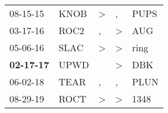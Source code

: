 \begin{supertabular}{p{0.07\textwidth}p{0.06\textwidth}p{0.02\textwidth}p{0.02\textwidth}p{0.06\textwidth}}
          08-15-15\textsuperscript{} &           KNOB\textsuperscript{} &     \textgreater &                , &           PUPS\textsuperscript{} \\
          03-17-16\textsuperscript{} &           ROC2\textsuperscript{} &                , &     \textgreater &            AUG\textsuperscript{} \\
          05-06-16\textsuperscript{} &           SLAC\textsuperscript{} &     \textgreater &     \textgreater &           ring\textsuperscript{} \\
 \textbf{02-17-17\textsuperscript{}} &           UPWD\textsuperscript{} &                  &     \textgreater &            DBK\textsuperscript{} \\
          06-02-18\textsuperscript{} &           TEAR\textsuperscript{} &                , &                , &           PLUN\textsuperscript{} \\
          08-29-19\textsuperscript{} &           ROCT\textsuperscript{} &     \textgreater &     \textgreater &           1348\textsuperscript{} \\
\end{supertabular}
